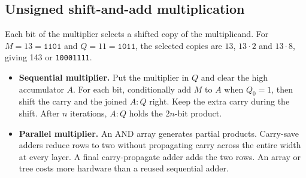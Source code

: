 \documentclass[12pt,a4paper]{article}
\begin{document}
\subsection{Unsigned shift-and-add multiplication}
Each bit of the multiplier selects a shifted copy of the multiplicand. For $M=13=\texttt{1101}$ and $Q=11=\texttt{1011}$, the selected copies are $13$, $13\cdot2$ and $13\cdot8$, giving 143 or \texttt{10001111}.
\begin{itemize}[leftmargin=*,itemsep=3pt]
\item \textbf{Sequential multiplier.} Put the multiplier in $Q$ and clear the high accumulator $A$. For each bit, conditionally add $M$ to $A$ when $Q_0=1$, then shift the carry and the joined $A:Q$ right. Keep the extra carry during the shift. After $n$ iterations, $A:Q$ holds the $2n$-bit product.
\item \textbf{Parallel multiplier.} An AND array generates partial products. Carry-save adders reduce rows to two without propagating carry across the entire width at every layer. A final carry-propagate adder adds the two rows. An array or tree costs more hardware than a reused sequential adder.
\end{itemize}
\end{document}
